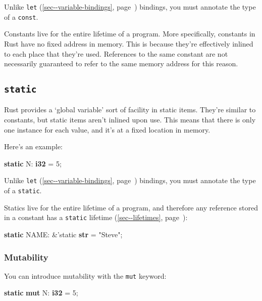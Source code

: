 \documentclass[a4paper,]{book}
\renewcommand*{\hyperref}[2][\ar]{%
  \def\ar{#2}%
  #2 (\autoref{#1}, page~\pageref{#1})}
\newenvironment{Shaded}{\begin{snugshade}}{\end{snugshade}}
\newcommand{\KeywordTok}[1]{\textcolor[rgb]{0.13,0.29,0.53}{\textbf{{#1}}}}
\newcommand{\DecValTok}[1]{\textcolor[rgb]{0.00,0.00,0.81}{{#1}}}
\newcommand{\StringTok}[1]{\textcolor[rgb]{0.31,0.60,0.02}{{#1}}}
\newcommand{\OtherTok}[1]{\textcolor[rgb]{0.56,0.35,0.01}{{#1}}}
\newcommand{\NormalTok}[1]{{#1}}
\begin{document}
Unlike \hyperref[sec--variable-bindings]{\texttt{let}} bindings, you
must annotate the type of a \texttt{const}.

Constants live for the entire lifetime of a program. More specifically,
constants in Rust have no fixed address in memory. This is because
they're effectively inlined to each place that they're used. References
to the same constant are not necessarily guaranteed to refer to the same
memory address for this reason.

\subsection{\texorpdfstring{\texttt{static}}{static}}\label{static-1}

Rust provides a `global variable' sort of facility in static items.
They're similar to constants, but static items aren't inlined upon use.
This means that there is only one instance for each value, and it's at a
fixed location in memory.

Here's an example:

\begin{Shaded}
\begin{Highlighting}[]
\KeywordTok{static} \NormalTok{N: }\KeywordTok{i32} \NormalTok{= }\DecValTok{5}\NormalTok{;}
\end{Highlighting}
\end{Shaded}

Unlike \hyperref[sec--variable-bindings]{\texttt{let}} bindings, you
must annotate the type of a \texttt{static}.

Statics live for the entire lifetime of a program, and therefore any
reference stored in a constant has a
\hyperref[sec--lifetimes]{\texttt{\textquotesingle{}static} lifetime}:

\begin{Shaded}
\begin{Highlighting}[]
\KeywordTok{static} \NormalTok{NAME: &}\OtherTok{'static} \KeywordTok{str} \NormalTok{= }\StringTok{"Steve"}\NormalTok{;}
\end{Highlighting}
\end{Shaded}

\subsubsection{Mutability}\label{mutability}

You can introduce mutability with the \texttt{mut} keyword:

\begin{Shaded}
\begin{Highlighting}[]
\KeywordTok{static} \KeywordTok{mut} \NormalTok{N: }\KeywordTok{i32} \NormalTok{= }\DecValTok{5}\NormalTok{;}
\end{Highlighting}
\end{Shaded}
\end{document}
